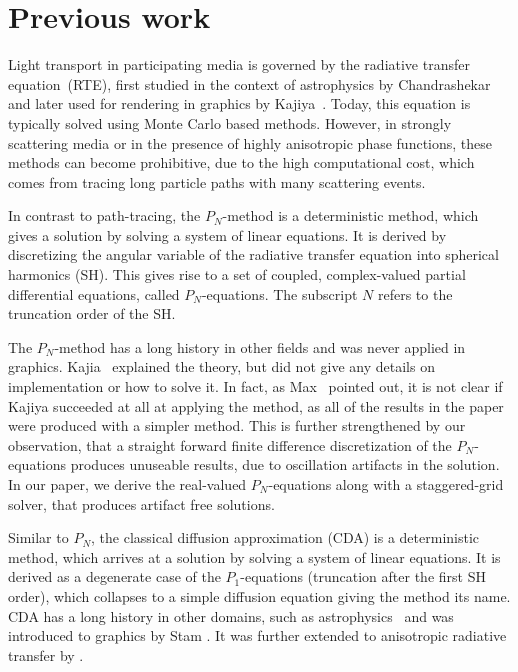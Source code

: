 \section{Previous work}

Light transport in participating media is governed by the radiative transfer equation~(RTE), first studied in the context of astrophysics by Chandrashekar~\cite{Chandrasekhar60} and later used for rendering in graphics by Kajiya~\cite{Kajiya86}. Today, this equation is typically solved using Monte Carlo based methods. However, in strongly scattering media or in the presence of highly anisotropic phase functions, these methods can become prohibitive, due to the high computational cost, which comes from tracing long particle paths with many scattering events.

In contrast to path-tracing, the $P_N$-method is a deterministic method, which gives a solution by solving a system of linear equations. It is derived by discretizing the angular variable of the radiative transfer equation into spherical harmonics (SH). This gives rise to a set of coupled, complex-valued partial differential equations, called $P_N$-equations. The subscript $N$ refers to the truncation order of the SH. 

The $P_N$-method has a long history in other fields and was never applied in graphics. Kajia~\cite{Kajiya84} explained the theory, but did not give any details on implementation or how to solve it. In fact, as Max~\cite{Max95} pointed out, it is not clear if Kajiya succeeded at all at applying the method, as all of the results in the paper were produced with a simpler method. This is further strengthened by our observation, that a straight forward finite difference discretization of the $P_N$-equations produces unuseable results, due to oscillation artifacts in the solution. In our paper, we derive the real-valued $P_N$-equations along with a staggered-grid solver, that produces artifact free solutions.

Similar to $P_N$, the classical diffusion approximation (CDA) is a deterministic method, which arrives at a solution by solving a system of linear equations. It is derived as a degenerate case of the $P_1$-equations (truncation after the first SH order), which collapses to a simple diffusion equation giving the method its name. CDA has a long history in other domains, such as astrophysics~\cite{Ishimaru78} and was introduced to graphics by Stam \cite{Stam95}. It was further extended to anisotropic radiative transfer by \cite{Jakob10}.

